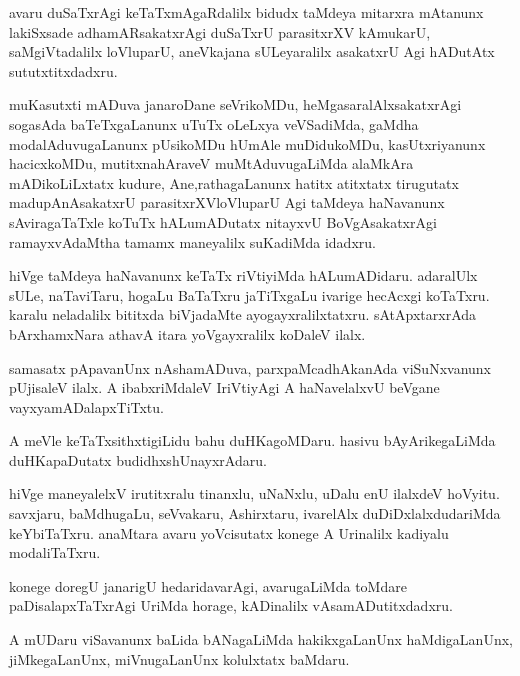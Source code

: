 \documentclass{article}
\begin{document}
\begin{mn}
avaru duSaTxrAgi keTaTxmAgaRdalilx bidudx taMdeya mitarxra mAtanunx lakiSxsade adhamARsakatxrAgi 
duSaTxrU parasitxrXV kAmukarU, saMgiVtadalilx loVluparU, aneVkajana sULeyaralilx asakatxrU Agi 
hADutAtx sututxtitxdadxru.
\end{mn}

\begin{mn}
muKasutxti mADuva janaroDane seVrikoMDu, heMgasaralAlxsakatxrAgi sogasAda baTeTxgaLanunx uTuTx 
oLeLxya veVSadiMda, gaMdha modalAduvugaLanunx pUsikoMDu hUmAle muDidukoMDu, kasUtxriyanunx 
hacicxkoMDu, mutitxnahAraveV muMtAduvugaLiMda alaMkAra mADikoLiLxtatx kudure, Ane,rathagaLanunx 
hatitx atitxtatx tirugutatx madupAnAsakatxrU parasitxrXVloVluparU Agi taMdeya haNavanunx  
sAviragaTaTxle koTuTx hALumADutatx nitayxvU BoVgAsakatxrAgi ramayxvAdaMtha tamamx maneyalilx 
suKadiMda idadxru.
\end{mn}

\begin{mn}
hiVge taMdeya haNavanunx keTaTx riVtiyiMda hALumADidaru. adaralUlx sULe, naTaviTaru, hogaLu BaTaTxru
jaTiTxgaLu ivarige hecAcxgi koTaTxru. karalu neladalilx bititxda biVjadaMte ayogayxralilxtatxru. 
sAtApxtarxrAda bArxhamxNara athavA itara yoVgayxralilx koDaleV ilalx.
\end{mn}

\begin{mn}
samasatx pApavanUnx nAshamADuva, parxpaMcadhAkanAda viSuNxvanunx pUjisaleV ilalx. A ibabxriMdaleV 
IriVtiyAgi A haNavelalxvU beVgane vayxyamADalapxTiTxtu.
\end{mn}

\begin{mn}
A meVle keTaTxsithxtigiLidu bahu duHKagoMDaru. hasivu bAyArikegaLiMda duHKapaDutatx 
budidhxshUnayxrAdaru.
\end{mn}

\begin{mn}
hiVge maneyalelxV irutitxralu tinanxlu, uNaNxlu, uDalu enU ilalxdeV hoVyitu. savxjaru, baMdhugaLu, 
seVvakaru, Ashirxtaru, ivarelAlx duDiDxlalxdudariMda keYbiTaTxru. anaMtara avaru yoVcisutatx 
konege A Urinalilx kadiyalu modaliTaTxru.
\end{mn}

\begin{mn}
konege doregU janarigU hedaridavarAgi, avarugaLiMda toMdare paDisalapxTaTxrAgi UriMda horage, 
kADinalilx vAsamADutitxdadxru.
\end{mn}

\begin{mn}
A mUDaru viSavanunx baLida bANagaLiMda hakikxgaLanUnx haMdigaLanUnx, jiMkegaLanUnx, miVnugaLanUnx 
kolulxtatx baMdaru.
\end{mn}
\end{document}
